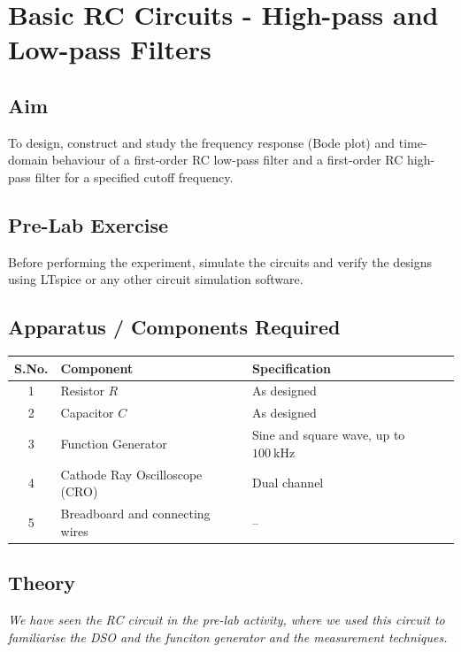 
\chapter{Basic RC Circuits - High-pass and Low-pass Filters}

\section{Aim}
To design, construct and study the frequency response (Bode plot) and
time-domain behaviour of a first-order RC low-pass filter and a first-order
RC high-pass filter for a specified cutoff frequency.
\section{Pre-Lab Exercise}
Before performing the experiment, simulate the circuits and verify the designs using LTspice or any other circuit simulation software. 
\section{Apparatus / Components Required}
\begin{center}
	\begin{tabular}{@{}cll@{}}
		\toprule
		S.No. & Component & Specification \\
		\midrule
		1 & Resistor $R$ & As designed \\
		2 & Capacitor $C$ & As designed \\
		3 & Function Generator & Sine and square wave, up to $100\ \text{kHz}$ \\
		4 & Cathode Ray Oscilloscope (CRO) & Dual channel \\
		5 & Breadboard and connecting wires & -- \\
		\bottomrule
	\end{tabular}
\end{center}

\section{Theory}
\emph{We have seen the RC circuit in the pre-lab activity, where we used this circuit to familiarise the DSO and the funciton generator and the measurement techniques.}

